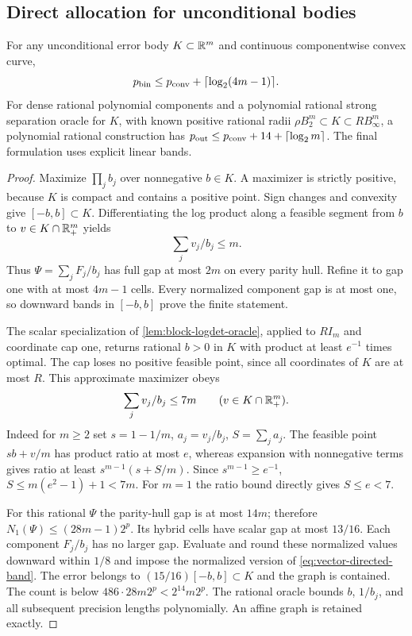 \subsection{Direct allocation for unconditional bodies}

\begin{proposition}\label{prop:vector-log-product}
For any unconditional error body $K\subset\mathbb R^m$ and continuous
componentwise convex curve,
\[
 p_{\mathrm{bin}}\le p_{\mathrm{conv}}+\lceil\log_2(4m-1)\rceil.
\]
For dense rational polynomial components and a polynomial rational
strong separation oracle for $K$, with known positive rational radii
$\rho B_2^m\subset K\subset R B_\infty^m$, a polynomial rational
construction has $p_{\mathrm{out}}\le p_{\mathrm{conv}}+14+\lceil\log_2m\rceil$.
The final formulation uses explicit linear bands.
\end{proposition}
\begin{proof}
Maximize $\prod_j b_j$ over nonnegative $b\in K$. A maximizer is
strictly positive, because $K$ is compact and contains a positive
point. Sign changes and convexity give $[-b,b]\subset K$.
Differentiating the log product along a feasible segment from $b$ to
$v\in K\cap\mathbb R_+^m$ yields
\begin{equation}\label{eq:product-support}
 \sum_jv_j/b_j\le m.
\end{equation}
Thus $\Psi=\sum_jF_j/b_j$ has full gap at most $2m$ on every parity
hull. Refine it to gap one with at most $4m-1$ cells. Every normalized
component gap is at most one, so downward bands in $[-b,b]$ prove
the finite statement.

The scalar specialization of \cref{lem:block-logdet-oracle}, applied
to $RI_m$ and coordinate cap one, returns rational $b>0$ in $K$ with
product at least $e^{-1}$ times optimal. The cap loses no positive
feasible point, since all coordinates of $K$ are at most $R$.
This approximate maximizer obeys
\begin{equation}\label{eq:approximate-product-support}
 \sum_jv_j/b_j\le7m\qquad(v\in K\cap\mathbb R_+^m).
\end{equation}
Indeed for $m\ge2$ set $s=1-1/m$, $a_j=v_j/b_j$, $S=\sum_ja_j$.
The feasible point $sb+v/m$ has product ratio at most $e$, whereas
expansion with nonnegative terms gives ratio at least
$s^{m-1}(s+S/m)$. Since $s^{m-1}\ge e^{-1}$,
$S\le m(e^2-1)+1<7m$. For $m=1$ the ratio bound directly gives
$S\le e<7$.

For this rational $\Psi$ the parity-hull gap is at most $14m$;
therefore $N_1(\Psi)\le(28m-1)2^p$. Its hybrid cells have scalar gap
at most $13/16$. Each component $F_j/b_j$ has no larger gap.
Evaluate and round these normalized values downward within $1/8$
and impose the normalized version of \eqref{eq:vector-directed-band}.
The error belongs to $(15/16)[-b,b]\subset K$ and the graph is
contained. The count is below $486\cdot28m2^p<2^{14}m2^p$.
The rational oracle bounds $b$, $1/b_j$, and all subsequent precision
lengths polynomially. An affine graph is retained exactly.
\end{proof}

